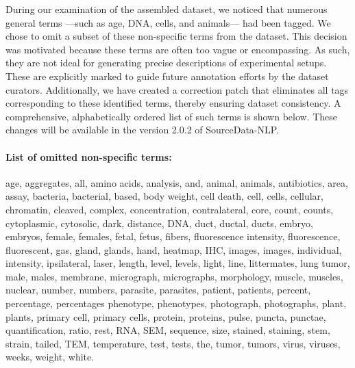 \documentclass{bioinfo}
\begin{document}
During our examination of the assembled dataset, we noticed that numerous general terms —such as age, DNA, cells, and animals— had been tagged. We chose to omit a subset of these non-specific terms from the dataset. This decision was motivated because these terms are often too vague or encompassing. As such, they are not ideal for generating precise descriptions of experimental setups. These are explicitly marked to guide future annotation efforts by the dataset curators. Additionally, we have created a correction patch that eliminates all tags corresponding to these identified terms, thereby ensuring dataset consistency. A comprehensive, alphabetically ordered list of such terms is shown below. These changes will be available in the version 2.0.2 of SourceData-NLP.

\paragraph{List of omitted non-specific terms:} age, aggregates, all, amino acids, analysis, and, animal, animals, antibiotics, area, assay, bacteria, bacterial, based, body weight, cell death, cell, cells, cellular, chromatin, cleaved, complex, concentration, contralateral, core, count, counts, cytoplasmic, cytosolic, dark, distance, DNA, duct, ductal, ducts, embryo, embryos, female, females, fetal, fetus, fibers, fluorescence intensity, fluorescence, fluorescent, gas, gland, glands, hand, heatmap, IHC, images, images, individual, intensity, ipsilateral, laser, length, level, levels, light, line, littermates, lung tumor, male, males, membrane, micrograph, micrographs, morphology, muscle, muscles, nuclear, number, numbers, parasite, parasites, patient, patients, percent, percentage, percentages phenotype, phenotypes, photograph, photographs, plant,  plants, primary cell,  primary cells, protein, proteins, pulse, puncta, punctae, quantification, ratio, rest, RNA, SEM, sequence, size, stained, staining, stem, strain, tailed, TEM, temperature, test, tests, the, tumor, tumors, virus, viruses, weeks, weight, white.
\end{document}
